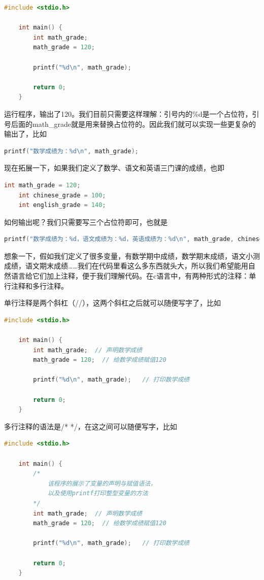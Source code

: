 \begin{lstlisting}[language=C]
    #include <stdio.h>

    int main() {
        int math_grade;
        math_grade = 120;

        printf("%d\n", math_grade); 

        return 0;
    }
\end{lstlisting}

运行程序，输出了120。我们目前只需要这样理解：引号内的\%d是一个占位符，引号后面的math\_grade就是用来替换占位符的。因此我们就可以实现一些更复杂的输出了，比如

\begin{lstlisting}[language=C]
    printf("数学成绩为：%d\n", math_grade); 
\end{lstlisting}

现在拓展一下，如果我们定义了数学、语文和英语三门课的成绩，也即

\begin{lstlisting}[language=C]
    int math_grade = 120;
    int chinese_grade = 100;
    int english_grade = 140;
\end{lstlisting}

如何输出呢？我们只需要写三个占位符即可，也就是

\begin{lstlisting}[language=C]
    printf("数学成绩为：%d，语文成绩为：%d，英语成绩为：%d\n", math_grade, chinese_grade, english_grade); 
\end{lstlisting}

想象一下，假如我们定义了很多变量，有数学期中成绩，数学期末成绩，语文小测成绩，语文期末成绩……我们在代码里看这么多东西就头大，所以我们希望能用自然语言给它们加上注释，便于我们理解代码。在c语言中，有两种形式的注释：单行注释和多行注释。

单行注释是两个斜杠（//），这两个斜杠之后就可以随便写字了，比如

\begin{lstlisting}[language=C]
    #include <stdio.h>

    int main() {
        int math_grade;  // 声明数学成绩
        math_grade = 120;  // 给数学成绩赋值120

        printf("%d\n", math_grade);   // 打印数学成绩

        return 0;
    }
\end{lstlisting}

多行注释的语法是/* */，在这之间可以随便写字，比如

\begin{lstlisting}[language=C]
    #include <stdio.h>

    int main() {
        /*
            该程序的展示了变量的声明与赋值语法，
            以及使用printf打印整型变量的方法
        */
        int math_grade;  // 声明数学成绩
        math_grade = 120;  // 给数学成绩赋值120

        printf("%d\n", math_grade);   // 打印数学成绩

        return 0;
    }
\end{lstlisting}

